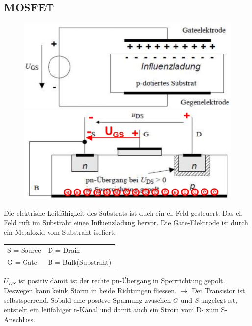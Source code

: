 \subsection{MOSFET}
\begin{figure}
    \vspace{-1cm}
    \includegraphics[width=\linewidth]{images/mosfetprinz}
    \newline
    \includegraphics[width=\linewidth]{images/mosfetprak}
\end{figure}
Die elektrishe Leitfähigkeit des Substrats ist duch ein el. Feld gesteuert. Das el. Feld ruft im Substraht einee Influenzladung hervor.\newline
Die Gate-Elektrode ist durch ein Metaloxid vom Substraht isoliert.\newline
\vspace{0.4cm}
\begin{tabular}{ll}
    S = Source & D = Drain\\
    G = Gate & B = Bulk(Substraht)\\
\end{tabular}\newline
$ U_{DS} $ ist positiv damit ist der rechte pn-Übergang in Sperrrichtung gepolt. Deswegen kann keink Storm in beide Richtungen fliessen.\newline
$ \rightarrow $ Der Transistor ist selbstsperrend.\newline
\danger Sobald eine positive Spannung zwischen $ G $ und $ S $ angelegt ist, entsteht ein leitfähiger n-Kanal und damit auch ein Strom vom D- zum S-Anschluss.
 \vspace{-0.2cm}
